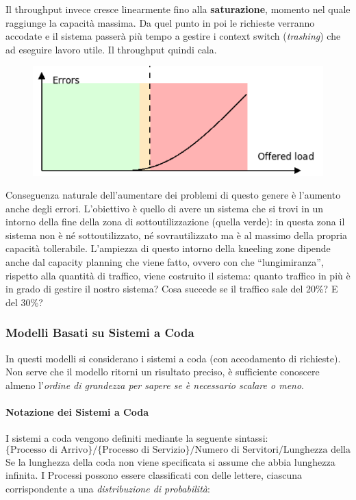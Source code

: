 \documentclass{article}
\begin{document}
		Il throughput invece cresce linearmente fino alla \textbf{saturazione}, momento nel quale raggiunge la capacità massima. Da quel punto in poi le richieste verranno accodate e il sistema passerà più tempo a gestire i context switch (\textit{trashing}) che ad eseguire lavoro utile. Il throughput quindi cala.
		
		\begin{figure}[ht]
			\centering
			\includegraphics[width=0.7\linewidth]{SAC_D1_load3}
			\label{fig:sacd1load3}
		\end{figure}
		
		Conseguenza naturale dell’aumentare dei problemi di questo genere è l'aumento anche degli errori.
		L’obiettivo è quello di avere un sistema che si trovi in un intorno della fine della zona di sottoutilizzazione (quella verde): in questa zona il sistema non è né sottoutilizzato, né sovrautilizzato ma è al massimo della propria capacità tollerabile.
		L’ampiezza di questo intorno della kneeling zone dipende anche dal
		capacity planning che viene fatto, ovvero con che “lungimiranza”, rispetto alla quantità di traffico, viene costruito il sistema: quanto traffico in più è in grado di gestire il nostro sistema? Cosa succede se il traffico sale del 20\%? E del 30\%?
		
		
		\subsubsection{Modelli Basati su Sistemi a
			Coda}\label{modelli-basati-su-sistemi-a-coda}
		
		In questi modelli si considerano i sistemi a coda (con
		accodamento di richieste). Non serve che il modello ritorni un
		risultato preciso, è sufficiente conoscere almeno l'\emph{ordine di grandezza
			per sapere se è necessario scalare o meno}.
		
		\paragraph{Notazione dei Sistemi a Coda}\label{notazione-dei-sistemi-a-coda}
		I sistemi a coda vengono definiti mediante la seguente sintassi: \[
		\text{\{Processo di Arrivo\}/\{Processo di Servizio\}/Numero di Servitori/Lunghezza della Coda\}}
		\] Se la lunghezza della coda non viene specificata si assume che abbia
		lunghezza infinita. I Processi possono essere classificati con
		delle lettere, ciascuna corrispondente a una \emph{distribuzione di
			probabilità}:
		
\end{document}
